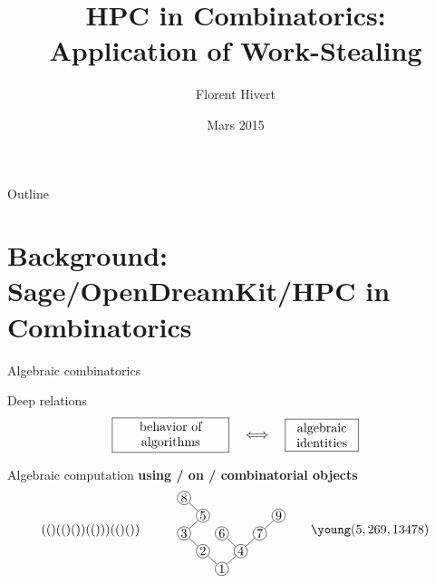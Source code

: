 \documentclass[compress,11pt]{beamer}
\title{\bf\LARGE HPC in Combinatorics:  \\
Application of Work-Stealing\\[5mm]}
\author{Florent Hivert}
\institute[LRI]{
  LRI / Université Paris Sud 11 / CNRS}
\date[Décembre 2014]{Mars 2015}
\begin{document}
\frame{\titlepage}

\begin{frame}{Outline}

  \tableofcontents
\end{frame}


\section{Background: Sage/OpenDreamKit/HPC in Combinatorics}

\begin{frame}[fragile]{Algebraic combinatorics}

Deep relations
$$\fbox{\parbox{3cm}{\centering behavior of algorithms}}
 \quad\Longleftrightarrow\quad
\fbox{\parbox{1.8cm}{\centering algebraic identities}}$$
\medskip

Algebraic computation
{\textbf{using / on / combinatorial objects}}%
$$
(()(()())(()))(()())
\qquad
  \begin{tikzpicture}[baseline=(current bounding box.center), scale=0.7, inner
    sep=0.3mm, %
    level distance=7mm %
   ]
    \node[circle, draw] {1} [grow'=up]
        child {node[circle, draw] {2}
           child{node[circle,draw] {3}
             child{ {} edge from parent[draw=none]}
             child{node[circle,draw] {5}
               child{node[circle,draw] {8}}
               child{ {} edge from parent[draw=none]}
             }
           }
           child{ {} edge from parent[draw=none]}
        }
        child {node[circle, draw] {4}
           child{node[circle,draw] {6}}
           child{node[circle,draw] {7}
             child{ {} edge from parent[draw=none]}
             child{node[circle,draw] {9}}
           }
        }
   ;
  \end{tikzpicture}
\qquad
\young(5,269,13478)
$$
\end{frame}
\end{document}
